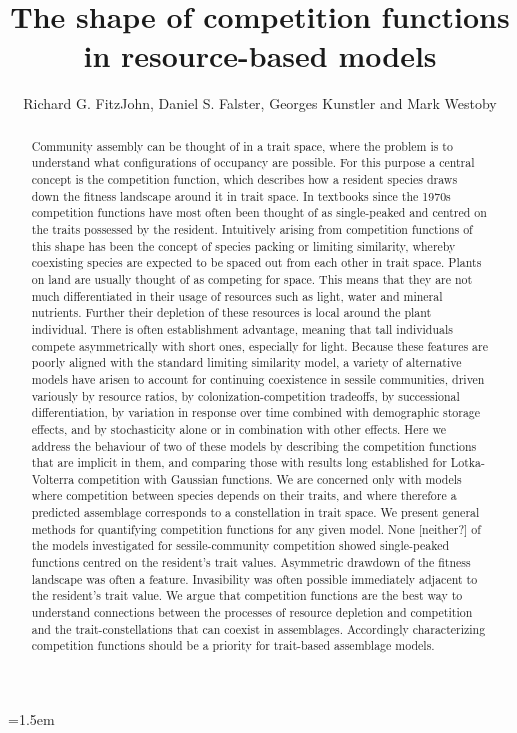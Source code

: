 \documentclass[a4paper,11pt]{article}
\title{The shape of competition functions in resource-based models}
\author{Richard G. FitzJohn, Daniel S. Falster, Georges Kunstler and Mark Westoby}
\date{}
\affiliation{Department of Biological Sciences, Macquarie University,
  Sydney, Australia}
\begin{document}

\mstitlepage
\parindent=1.5em
\addtolength{\parskip}{.3em}

\begin{abstract}
Community assembly can be thought of in a trait space, where the problem is to understand what configurations of occupancy are possible. For this purpose a central concept is the competition function, which describes how a resident species draws down the fitness landscape around it in trait space. In textbooks since the 1970s competition functions have most often been thought of as single-peaked and centred on the traits possessed by the resident. Intuitively arising from competition functions of this shape has been the concept of species packing or limiting similarity, whereby coexisting species are expected to be spaced out from each other in trait space.
Plants on land are usually thought of as competing for space. This means that they are not much differentiated in their usage of resources such as light, water and mineral nutrients. Further their depletion of these resources is local around the plant individual. There is often establishment advantage, meaning that tall individuals compete asymmetrically with short ones, especially for light. Because these features are poorly aligned with the standard limiting similarity model, a variety of alternative models have arisen to account for continuing coexistence in sessile communities, driven variously by resource ratios, by colonization-competition tradeoffs, by successional differentiation, by variation in response over time combined with demographic storage effects, and by stochasticity alone or in combination with other effects.
Here we address the behaviour of two of these models by describing the competition functions that are implicit in them, and comparing those with results long established for Lotka-Volterra competition with Gaussian functions. We are concerned only with models where competition between species depends on their traits, and where therefore a predicted assemblage corresponds to a constellation in trait space. We present general methods for quantifying competition functions for any given model.
None [neither?] of the models investigated for sessile-community competition showed single-peaked functions centred on the resident's trait values. Asymmetric drawdown of the fitness landscape was often a feature. Invasibility was often possible immediately adjacent to the resident's trait value. We argue that competition functions are the best way to understand connections between the processes of resource depletion and competition and the trait-constellations that can coexist in assemblages. Accordingly characterizing competition functions should be a priority for trait-based assemblage models.

\end{abstract}
\end{document}
